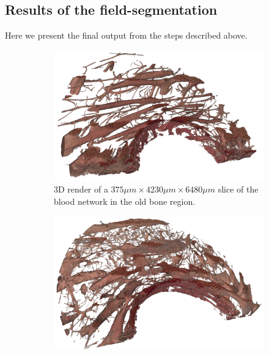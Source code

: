 \subsection{Results of the field-segmentation}

Here we present the final output from the steps described above.

\begin{figure}
    \centering
    \begin{subfigure}[b]{\linewidth}
        \includegraphics[width=\linewidth]{figures/blood_old_bone_100.png}
        \caption{3D render of a $375\mu m \times 4230\mu m \times 6480\mu m$ slice of the blood network in the old bone region.}
        \label{fig:blood-old-slice}
    \end{subfigure}
    \begin{subfigure}[b]{\linewidth}
        \includegraphics[width=\linewidth]{figures/blood_new_bone_100.png}

\end{subfigure}
\end{figure}
